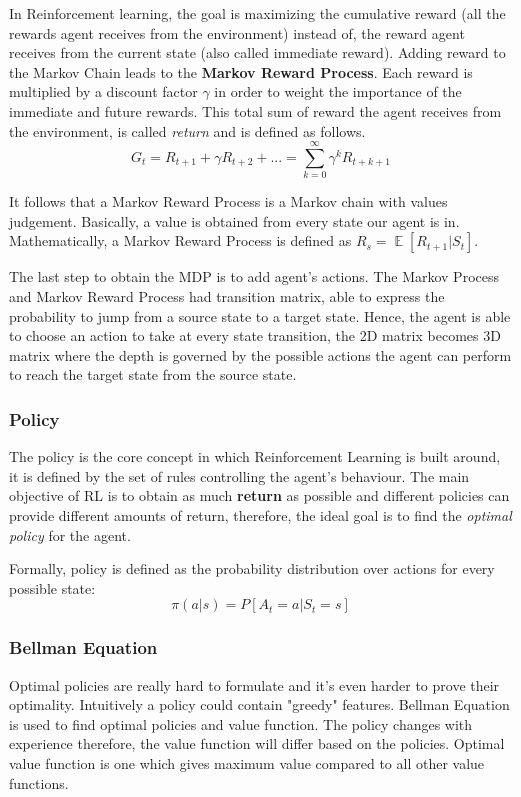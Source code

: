 \documentclass[12pt]{article}
\DeclareMathOperator{\EX}{\mathbb{E}}%
\begin{document}
In Reinforcement learning, the goal is maximizing the cumulative reward (all the rewards agent receives from the environment) instead of, the reward agent receives from the current state (also called immediate reward). Adding reward to the Markov Chain leads to the \textbf{Markov Reward Process}. Each reward is multiplied by a discount factor $\gamma$ in order to weight the importance of the immediate and future rewards. This total sum of reward the agent receives from the environment, is called \textit{return} and is defined as follows.
\[G_t = R_{t+1} + \gamma R_{t+2} + ...= \sum^\infty_{k=0} \gamma^k R_{t+k+1}\]

It follows that a Markov Reward Process is a Markov chain with values judgement. Basically, a value is obtained from every state our agent is in. Mathematically, a Markov Reward Process is defined as $R_s = \EX[R_{t+1}|S_t]$.

The last step to obtain the MDP is to add agent's actions. The Markov Process and Markov Reward Process had transition matrix, able to express the probability to jump from a source state to a target state. Hence, the agent is able to choose an action to take at every state transition, the 2D matrix becomes 3D matrix where the depth is governed by the possible actions the agent can perform to reach the target state from the source state.

\subsubsection{Policy}

The policy is the core concept in which Reinforcement Learning is built around, it is defined by the set of rules controlling the agent's behaviour.
The main objective of RL is to obtain as much \textbf{return} as possible and different policies can provide different amounts of return, therefore, the ideal goal is to find the \textit{optimal policy} for the agent. 

Formally, policy is defined as the probability distribution over actions for every possible state:
\[ \pi(a|s) = P[A_t=a|S_t=s]\]

\subsubsection{Bellman Equation}

Optimal policies are really hard to formulate and it's even harder to prove their optimality. Intuitively a policy could contain "greedy" features.
Bellman Equation is used to find optimal policies and value function. The policy changes with experience therefore, the value function will differ based on the policies. Optimal value function is one which gives maximum value compared to all other value functions.
\end{document}
